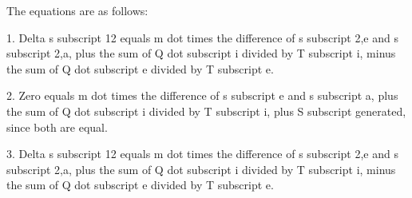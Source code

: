The equations are as follows:

1. Delta s subscript 12 equals m dot times the difference of s subscript 2,e and s subscript 2,a, plus the sum of Q dot subscript i divided by T subscript i, minus the sum of Q dot subscript e divided by T subscript e.

2. Zero equals m dot times the difference of s subscript e and s subscript a, plus the sum of Q dot subscript i divided by T subscript i, plus S subscript generated, since both are equal.

3. Delta s subscript 12 equals m dot times the difference of s subscript 2,e and s subscript 2,a, plus the sum of Q dot subscript i divided by T subscript i, minus the sum of Q dot subscript e divided by T subscript e.